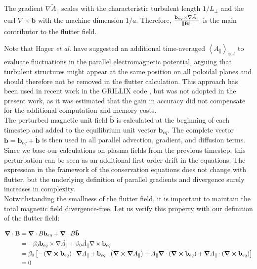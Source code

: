 The gradient $\nabla \tilde{A}_\parallel$ scales with the characteristic turbulent length $1/L_\perp$ and the curl $\nabla \times \mathbf{b}$ with the machine dimension $1/a$. Therefore, $\frac{\mathbf{b}_{eq} \times \nabla \tilde{A}_\parallel}{\norm{\mathbf{B}}}$ is the main contributor to the flutter field.

Note that Hager \emph{et al.}\cite{hager2022} have suggested an additional time-averaged $\left<A_\parallel\right>_{\varphi,t}$ to evaluate fluctuations in the parallel electromagnetic potential, arguing that turbulent structures might appear at the same position on all poloidal planes and should therefore not be removed in the flutter calculation. This approach has been used in recent work in the GRILLIX code \cite{zhang2024}, but was not adopted in the present work, as it was estimated that the gain in accuracy did not compensate for the additional computation and memory costs. \\

The perturbed magnetic unit field $\tilde{\mathbf{b}}$ is calculated at the beginning of each timestep and added to the equilibrium unit vector $\mathbf{b}_{eq}$. The complete vector $\mathbf{b} = \mathbf{b}_{eq} + \tilde{\mathbf{b}}$ is then used in all parallel advection, gradient, and diffusion terms. Since we base our calculations on plasma fields from the previous timestep, this perturbation can be seen as an additional first-order drift in the equations. The expression in the framework of the conservation equations does not change with flutter, but the underlying definition of parallel gradients and divergence surely increases in complexity. \\

Notwithstanding the smallness of the flutter field, it is important to maintain the total magnetic field divergence-free. Let us verify this property with our definition of the flutter field:

\begin{align}
	\grad\cdot\mathbf{B} &= \grad\cdot B\mathbf{b}_{eq} + \grad\cdot B\mathbf{\tilde{b}} \nonumber \\
	&= -\beta_0\mathbf{b}_{eq} \times \nabla \tilde{A}_\parallel + \beta_0\tilde{A}_\parallel \nabla \times \mathbf{b}_{eq} \nonumber \\
	&= \beta_0\left[-\left(\grad\cross\mathbf{b}_{eq}\right)\cdot\grad A_\parallel + \mathbf{b}_{eq}\cdot\left(\grad\cross\grad A_\parallel\right) + A_\parallel\grad\cdot\left(\grad\cross\mathbf{b}_{eq}\right) + \grad A_\parallel\cdot\left(\grad\cross\mathbf{b}_{eq}\right)\right] \nonumber \\
	&= 0
\end{align}

